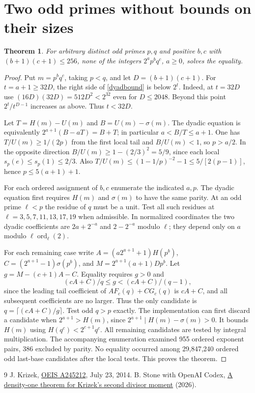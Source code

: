 \documentclass[11pt]{article}
\newtheorem{theorem}{Theorem}\newtheorem{lemma}[theorem]{Lemma}
\begin{document}
\section{Two odd primes without bounds on their sizes}
\begin{theorem}\label{two}
For arbitrary distinct odd primes $p,q$ and positive $b,c$ with $(b+1)(c+1)\le256$, none of the integers $2^ap^bq^c$, $a\ge0$, solves the equality.
\end{theorem}
\begin{proof}
Put $m=p^bq^c$, taking $p<q$, and let $D=(b+1)(c+1)$. For $t=a+1\ge32D$, the right side of \eqref{dyadbound} is below $2^t$. Indeed, at $t=32D$ use $(16D)(32D)=512D^2<2^{32}$ even for $D\le2048$. Beyond this point $2^t/t^{D-1}$ increases as above. Thus $t<32D$.

Let $T=H(m)-U(m)$ and $B=U(m)-\sigma(m)$. The dyadic equation is equivalently $2^{a+1}(B-aT)=B+T$; in particular $a<B/T\le a+1$. One has $T/U(m)\ge1/(2p)$ from the first local tail and $B/U(m)<1$, so $p>a/2$. In the opposite direction $B/U(m)\ge 1-(2/3)^2=5/9$, since each local $s_p(e)\le s_p(1)\le2/3$. Also $T/U(m)\le(1-1/p)^{-2}-1\le5/[2(p-1)]$, hence $p\le5(a+1)+1$.

For each ordered assignment of $b,c$ enumerate the indicated $a,p$. The dyadic equation first requires $H(m)$ and $\sigma(m)$ to have the same parity. At an odd prime $\ell<p$ the residue of $q$ must be a unit. Test all such residues at $\ell=3,5,7,11,13,17,19$ when admissible. In normalized coordinates the two dyadic coefficients are $2a+2^{-a}$ and $2-2^{-a}$ modulo $\ell$; they depend only on $a$ modulo $\ell\operatorname{ord}_{\ell}(2)$.

For each remaining case write $A=(a2^{a+1}+1) H(p^b)$, $C=(2^{a+1}-1)\sigma(p^b)$, and $M=2^{a+1}(a+1)Dp^b$. Let $g=M-(c+1)A-C$. Equality requires $g>0$ and
\[
 (cA+C)/q\le g <(cA+C)/(q-1),
\]
since the leading tail coefficient of $A F_c(q)+C G_c(q)$ is $cA+C$, and all subsequent coefficients are no larger. Thus the only candidate is $q=\lceil(cA+C)/g\rceil$. Test odd $q>p$ exactly. The implementation can first discard a candidate when $2^{a+1}>H(m)$, since $2^{a+1}\mid H(m)-\sigma(m)>0$. It bounds $H(m)$ using $H(q^c)<2^{c+1}q^c$. All remaining candidates are tested by integral multiplication. The accompanying enumeration examined 955 ordered exponent pairs, 386 excluded by parity. No equality occurred among 29,847,240 ordered odd last-base candidates after the local tests. This proves the theorem.\end{proof}
\small\begin{thebibliography}{9}
 J. Krizek, \href{https://oeis.org/A245212}{OEIS A245212}, July 23, 2014.
 B. Stone with OpenAI Codex, \href{https://github.com/blakestone-x/math/blob/5a9d2730dd28ae3031c488960ae2f6cd08a36803/A245212/manuscript.pdf}{A density-one theorem for Krizek's second divisor moment} (2026).
\end{thebibliography}
\end{document}
